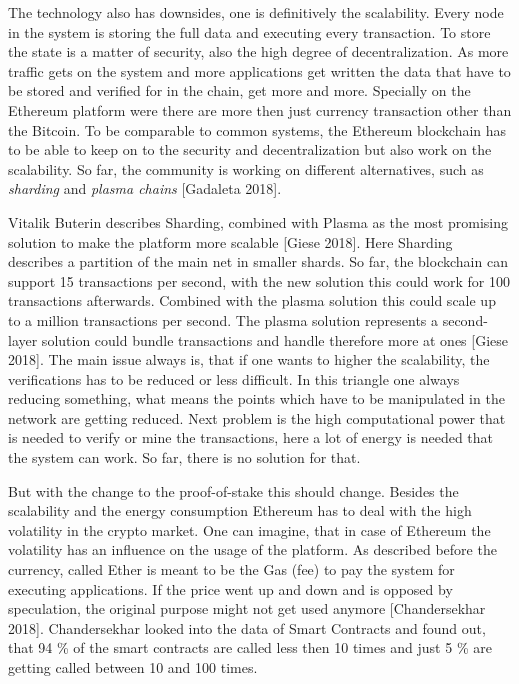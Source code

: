 The technology also has downsides, one is definitively the scalability. 
Every node in the system is storing the full data and executing every transaction. 
To store the state is a matter of security, also the high degree of decentralization. 
As more traffic gets on the system and more applications get written the data that have to be stored and verified for in the chain, get more and more. 
Specially on the Ethereum platform were there are more then just currency transaction other than the Bitcoin. 
To be comparable to common systems, the Ethereum blockchain has to be able to keep on to the security and decentralization but also work on the scalability. 
So far, the community is working on different alternatives, such as \emph{sharding} and \emph{plasma chains} [Gadaleta 2018].

Vitalik Buterin describes Sharding, combined with Plasma as the most promising solution to make the platform more scalable [Giese 2018].
Here Sharding describes a partition of the main net in smaller shards. 
So far, the blockchain can support 15 transactions per second, with the new solution this could work for 100 transactions afterwards. 
Combined with the plasma solution this could scale up to a million transactions per second. 
The plasma solution represents a second-layer solution could bundle transactions and handle therefore more at ones [Giese 2018].
The main issue always is, that if one wants to higher the scalability, the verifications has to be reduced or less difficult. 
In this triangle one always reducing something, what means the points which have to be manipulated in the network are getting reduced.
Next problem is the high computational power that is needed to verify or mine the transactions, here a lot of energy is needed that the system can work. So far, there is no solution for that.

But with the change to the proof-of-stake this should change.
Besides the scalability and the energy consumption Ethereum has to deal with the high volatility in the crypto market. 
One can imagine, that in case of Ethereum the volatility has an influence on the usage of the platform. 
As described before the currency, called Ether is meant to be the Gas (fee) to pay the system for executing applications. 
If the price went up and down and is opposed by speculation, the original purpose might not get used anymore [Chandersekhar 2018]. 
Chandersekhar looked into the data of Smart Contracts and found out, that 94 \% of the smart contracts are called less then 10 times and just 5 \% are getting called between 10 and 100 times. 
